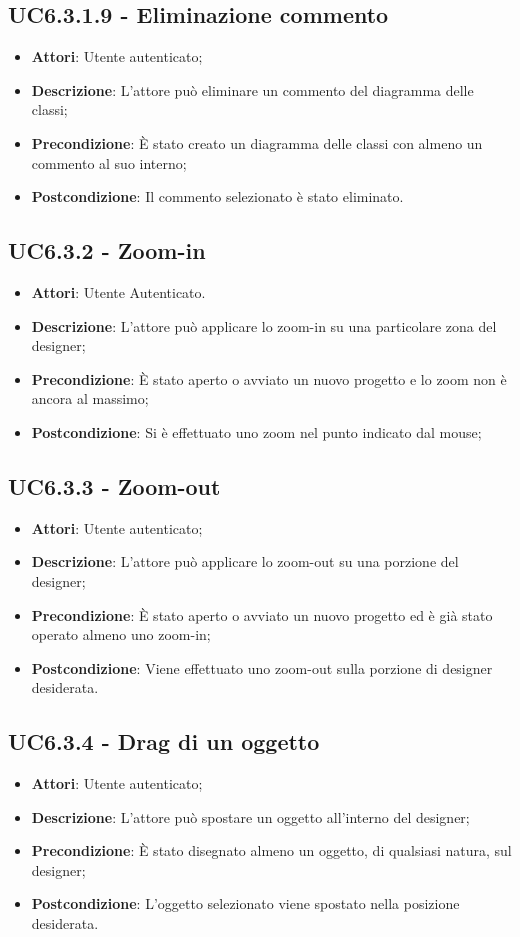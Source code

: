 \subsection{UC6.3.1.9 - Eliminazione commento} 
\label{ssec:UC6.3.1.9} 
\begin{itemize} 
\item \textbf{Attori}: Utente autenticato;
\item \textbf{Descrizione}: L'attore può eliminare un commento del diagramma delle classi;
\item \textbf{Precondizione}: È stato creato un diagramma delle classi con almeno un commento al suo interno;
\item \textbf{Postcondizione}: Il commento selezionato è stato eliminato.
\end{itemize} 
\subsection{UC6.3.2 - Zoom-in} 
\label{ssec:UC6.3.2} 
\begin{itemize} 
\item \textbf{Attori}: Utente Autenticato.
\item \textbf{Descrizione}: L'attore può applicare lo zoom-in su una particolare zona del designer;
\item \textbf{Precondizione}: È stato aperto o avviato un nuovo progetto e lo zoom non è ancora al massimo;
\item \textbf{Postcondizione}: Si è effettuato uno zoom nel punto indicato dal mouse;
\end{itemize} 
\subsection{UC6.3.3 - Zoom-out} 
\label{ssec:UC6.3.3} 
\begin{itemize} 
\item \textbf{Attori}: Utente autenticato;
\item \textbf{Descrizione}: L'attore può applicare lo zoom-out su una porzione del designer;
\item \textbf{Precondizione}: È stato aperto o avviato un nuovo progetto ed è già stato operato almeno uno zoom-in;
\item \textbf{Postcondizione}: Viene effettuato uno zoom-out sulla porzione di designer desiderata.
\end{itemize} 
\subsection{UC6.3.4 - Drag di un oggetto} 
\label{ssec:UC6.3.4} 
\begin{itemize} 
\item \textbf{Attori}: Utente autenticato;
\item \textbf{Descrizione}: L'attore può spostare un oggetto all'interno del designer;
\item \textbf{Precondizione}: È stato disegnato almeno un oggetto, di qualsiasi natura, sul designer;
\item \textbf{Postcondizione}: L'oggetto selezionato viene spostato nella posizione desiderata.
\end{itemize} 
